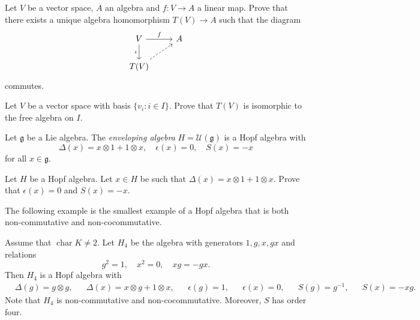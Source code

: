 \begin{exercise}
  Let $V$ be a vector space, $A$ an algebra and 
  $f\colon V\to A$ a linear map. Prove that there exists a unique
  algebra homomorphism $T(V)\to A$ such that the diagram
  \[\begin{tikzcd}
    V & A \\
    {T(V)}
    \arrow["f", from=1-1, to=1-2]
    \arrow["\iota"', from=1-1, to=2-1]
    \arrow[dashed, from=2-1, to=1-2]
  \end{tikzcd}
\]
  commutes. 
\end{exercise}

\begin{exercise}
  Let $V$ be a vector space with basis $\{v_i:i\in I\}$. Prove that $T(V)$ is
  isomorphic to the free algebra on $I$. 
\end{exercise}


\begin{example}
    Let $\mathfrak{g}$ be a Lie algebra. The \emph{enveloping algebra} $H=\mathcal{U}(\mathfrak{g})$ is a Hopf algebra with
    \[
    \Delta(x)=x\otimes 1+1\otimes x,\quad 
    \epsilon(x)=0,\quad 
    S(x)=-x
    \]
    for all $x\in\mathfrak{g}$. 
\end{example}

\begin{exercise}
\label{xca:primitives}
    Let $H$ be a Hopf algebra. Let $x\in H$ be such that 
    $\Delta(x)=x\otimes 1+1\otimes x$. Prove that 
    $\epsilon(x)=0$ and $S(x)=-x$. 
\end{exercise}


The following example is the smallest example of a Hopf algebra that is both non-commutative and non-cocommutative.

\begin{example}[Sweedler]
Assume that $\operatorname{char}K\ne2$. Let $H_4$ be
the algebra with generators $1,g,x,gx$ and relations
\[
g^2=1,\quad x^2=0,\quad xg=-gx.
\]
Then $H_4$ is a Hopf algebra with
\begin{align*}
&\Delta(g)=g\otimes g,
&&\Delta(x)=x\otimes g+1\otimes x,
&&\epsilon(g)=1,
&&\epsilon(x)=0,
&&S(g)=g^{-1},
&&S(x)=-xg.    
\end{align*}
Note that $H_4$ is non-commutative and non-cocommutative. Moreover, 
$S$ has order four. 
\end{example}

